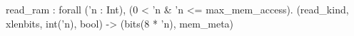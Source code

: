 read_ram : forall ('n : Int), (0 < 'n & 'n <= max_mem_access).
  (read_kind, xlenbits, int('n), bool) -> (bits(8 * 'n), mem_meta)